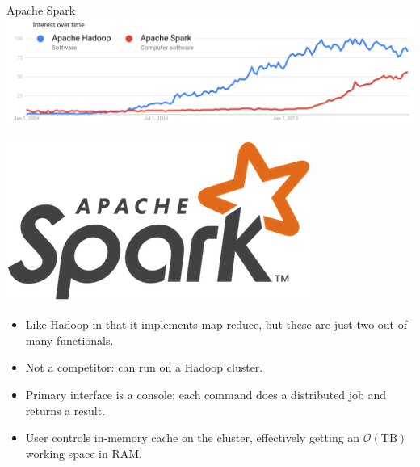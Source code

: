 \documentclass{beamer}
\begin{document}
\begin{frame}{Apache Spark}
\vspace{0.5 cm}
\includegraphics[width=\linewidth]{hadoop-versus-spark.png}

\vfill
\includegraphics[width=0.25\linewidth]{spark.png}

\begin{itemize}
\item Like Hadoop in that it implements map-reduce, but these are just two out of many functionals.
\item Not a competitor: can run on a Hadoop cluster.
\item Primary interface is a console: each command does a distributed job and returns a result.
\item User controls in-memory cache on the cluster, effectively getting an $\mathcal{O}(\mbox{TB})$ working space in RAM.
\end{itemize}
\end{frame}
\end{document}
